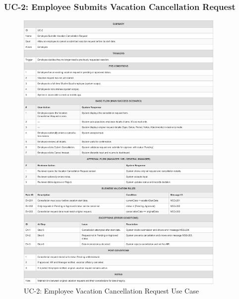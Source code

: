 \documentclass[12pt,a4paper]{article}
\begin{document}
\subsubsection{UC-2: Employee Submits Vacation Cancellation Request}
\begin{figure}[H]
\centering
\includegraphics[width=0.9\textwidth]{Use-Cases/UC-2-Employee-Vacation-Cancellation-Request/UC-2-Employee-Vacation-Cancellation-Request-1.png}
\caption{UC-2: Employee Vacation Cancellation Request Use Case}
\label{fig:uc2}
\end{figure}
\end{document}
